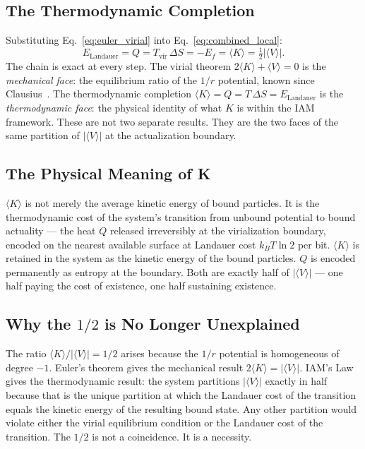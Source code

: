 \documentclass[12pt,a4paper]{article}
\begin{document}
\subsection{The Thermodynamic Completion}

Substituting Eq.~\eqref{eq:euler_virial} into
Eq.~\eqref{eq:combined_local}:
\begin{equation}
\boxed{E_\mathrm{Landauer} = Q = T_\mathrm{vir}\,\Delta S
= -E_f = \langle K \rangle
= \tfrac{1}{2}|\langle V \rangle|.}
\label{eq:identity}
\end{equation}
The chain is exact at every step. The virial theorem
$2\langle K \rangle + \langle V \rangle = 0$ is the
\textit{mechanical face}: the equilibrium ratio of the $1/r$
potential, known since Clausius~\citep{Clausius1870}. The
thermodynamic completion $\langle K \rangle = Q = T\,\Delta S
= E_\mathrm{Landauer}$ is the \textit{thermodynamic face}: the
physical identity of what $K$ is within the IAM framework.
These are not two separate results. They are the two faces of the same
partition of $|\langle V \rangle|$ at the actualization boundary.

\subsection{The Physical Meaning of K}

$\langle K \rangle$ is not merely the average kinetic energy of bound
particles. It is the thermodynamic cost of the system's transition from
unbound potential to bound actuality --- the heat $Q$ released
irreversibly at the virialization boundary, encoded on the nearest
available surface at Landauer cost $k_B T \ln 2$ per bit.
$\langle K \rangle$ is retained in the system as the kinetic energy
of the bound particles. $Q$ is encoded permanently as entropy at the
boundary. Both are exactly half of $|\langle V \rangle|$ --- one half
paying the cost of existence, one half sustaining existence.

\subsection{Why the $1/2$ is No Longer Unexplained}

The ratio $\langle K \rangle / |\langle V \rangle| = 1/2$ arises
because the $1/r$ potential is homogeneous of degree $-1$. Euler's
theorem gives the mechanical result $2\langle K \rangle = |\langle V
\rangle|$. IAM's Law gives the thermodynamic result: the system
partitions $|\langle V \rangle|$ exactly in half because that is the
unique partition at which the Landauer cost of the transition equals the
kinetic energy of the resulting bound state. Any other partition would
violate either the virial equilibrium condition or the Landauer cost of
the transition. The $1/2$ is not a coincidence. It is a necessity.
\end{document}
